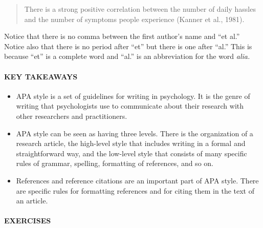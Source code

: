\documentclass[
]{krantz}
\providecommand{\tightlist}{%
  \setlength{\itemsep}{0pt}\setlength{\parskip}{0pt}}
\begin{document}
\begin{quote}
There is a strong positive correlation between the number of daily hassles and the number of symptoms people experience (Kanner et al., 1981).
\end{quote}

Notice that there is no comma between the first author's name and ``et al.'' Notice also that there is no period after ``et'' but there is one after ``al.'' This is because ``et'' is a complete word and ``al.'' is an abbreviation for the word \emph{alia.}

\paragraph*{KEY TAKEAWAYS}\label{key-takeaways-29}

\begin{itemize}
\tightlist
\item
  APA style is a set of guidelines for writing in psychology. It is the genre of writing that psychologists use to communicate about their research with other researchers and practitioners.
\item
  APA style can be seen as having three levels. There is the organization of a research article, the high-level style that includes writing in a formal and straightforward way, and the low-level style that consists of many specific rules of grammar, spelling, formatting of references, and so on.
\item
  References and reference citations are an important part of APA style. There are specific rules for formatting references and for citing them in the text of an article.
\end{itemize}

\paragraph*{EXERCISES}\label{exercises-24}
\end{document}
